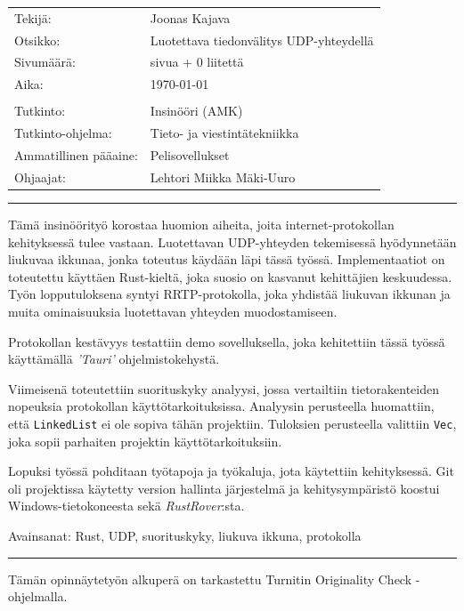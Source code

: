 \documentclass[a4paper,12pt]{article}
\newcommand{\me}{Joonas Kajava}
\renewcommand{\title}{Luotettava tiedonvälitys UDP-yhteydellä}
\newcommand{\appendixCount}{0}
\newcommand{\pageCount}{ \pageref{LastPage}}
\newcommand*\sepline{
    \begin{center}
        \rule[1ex]{\textwidth}{.5pt}
    \end{center}}
\begin{document}
\begin{titlepage}
        \begin{tabular} {l l}
            Tekijä:               & \me                                            \\
            Otsikko:              & \title                                         \\
            Sivumäärä:            & \pageCount{} sivua + \appendixCount{} liitettä \\
            Aika:                 & \today                                         \\
            \\
            Tutkinto: & Insinööri (AMK) \\
            Tutkinto-ohjelma: & Tieto- ja viestintätekniikka \\
            Ammatillinen pääaine: & Pelisovellukset \\
            Ohjaajat: & Lehtori Miikka Mäki-Uuro\\
        \end{tabular}
        \sepline
        Tämä insinöörityö korostaa huomion aiheita, joita internet-protokollan kehityksessä tulee vastaan. Luotettavan UDP-yhteyden tekemisessä hyödynnetään liukuvaa ikkunaa, jonka toteutus käydään läpi tässä työssä. Implementaatiot on toteutettu käyttäen Rust-kieltä, joka suosio on kasvanut kehittäjien keskuudessa. Työn lopputuloksena syntyi RRTP-protokolla, joka yhdistää liukuvan ikkunan ja muita ominaisuuksia luotettavan yhteyden muodostamiseen. \par

        Protokollan kestävyys testattiin demo sovelluksella, joka kehitettiin tässä työssä käyttämällä \textit{'Tauri'} ohjelmistokehystä.\par

        Viimeisenä toteutettiin suorituskyky analyysi, jossa vertailtiin tietorakenteiden nopeuksia protokollan käyttötarkoituksissa. Analyysin perusteella huomattiin, että \lstinline{LinkedList} ei ole sopiva tähän projektiin. Tuloksien perusteella valittiin \lstinline{Vec}, joka sopii parhaiten projektin käyttötarkoituksiin.\par

        Lopuksi työssä pohditaan työtapoja ja työkaluja, jota käytettiin kehityksessä. Git oli projektissa käytetty version hallinta järjestelmä ja kehitysympäristö koostui Windows-tietokoneesta sekä \textit{RustRover}:sta. \par
        Avainsanat: Rust, UDP, suorituskyky, liukuva ikkuna, protokolla 
        \sepline
        Tämän opinnäytetyön alkuperä on tarkastettu Turnitin Originality Check -ohjelmalla.
        \newpage


\end{titlepage}
\end{document}

